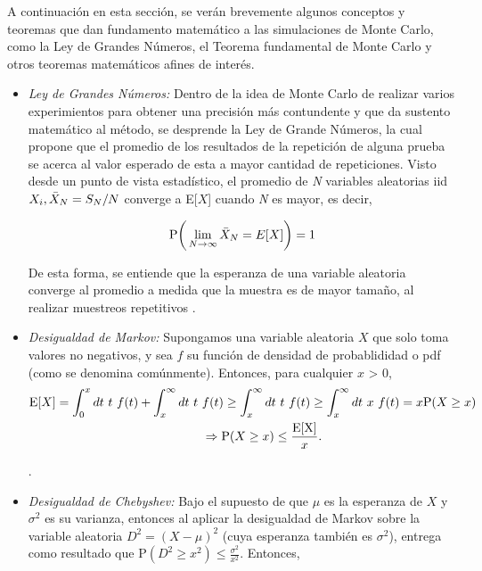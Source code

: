 \noindent A continuación en esta sección, se verán brevemente algunos conceptos y teoremas que dan fundamento matemático a las simulaciones de Monte Carlo, como la Ley de Grandes Números, el Teorema fundamental de Monte Carlo y otros teoremas matemáticos afines de interés.

\begin{itemize}
    \item \textit{Ley de Grandes Números:}
    \newline
    Dentro de la idea de Monte Carlo de realizar varios experimientos para obtener una precisión más contundente y que da sustento matemático al método, se desprende la Ley de Grande Números, la cual propone que el promedio de los resultados de la repetición de alguna prueba se acerca al valor esperado de esta a mayor cantidad de repeticiones. Visto desde un punto de vista estadístico, el promedio de \textit{N} variables aleatorias iid $X_i , \Bar{X}_{N} = S_N / N$ converge a E[$X$] cuando \textit{N} es mayor, es decir,

    \begin{equation}
        \text{P} \bigg( \lim_{N \rightarrow \infty} \Bar{X}_{N} = E[X] \bigg) = 1
    \end{equation}

    De esta forma, se entiende que la esperanza de una variable aleatoria converge al promedio a medida que la muestra es de mayor tamaño, al realizar muestreos repetitivos \citep{dekking2005}.
    
    \item \textit{Desigualdad de Markov:}
    \newline
    Supongamos una variable aleatoria $X$ que solo toma valores no negativos, y sea $f$ su función de densidad de probablididad o pdf (como se denomina comúnmente). Entonces, para cualquier $x$ > 0,
    \begin{align}
        \text{E}[X] = \int_{0}^{x} dt ~ t ~ f(t) + \int_{x}^{\infty} dt ~ t ~ &f(t) \geq \int_{x}^{\infty} dt ~ t ~ f(t) \newline \geq \int_{x}^{\infty} dt ~ x ~ f(t) = x \text{P} (X \geq x)\\
        &\Rightarrow \text{P}(X \geq x) \leq \dfrac{\text{E[X]}}{x}.
    \end{align}
    
    \citep{cohen2015}.
    
    \item \textit{Desigualdad de Chebyshev:}
    \newline
    Bajo el supuesto de que $\mu$ es la esperanza de $X$ y $\sigma^2$ es su varianza, entonces al aplicar la desigualdad de Markov sobre la variable aleatoria $D^2 = (X - \mu)^2$ (cuya esperanza también es $\sigma^2$), entrega como resultado que $\text{P}(D^2 \geq x^2) \leq \frac{\sigma^2}{x^2}$. Entonces,
    

\end{itemize}
